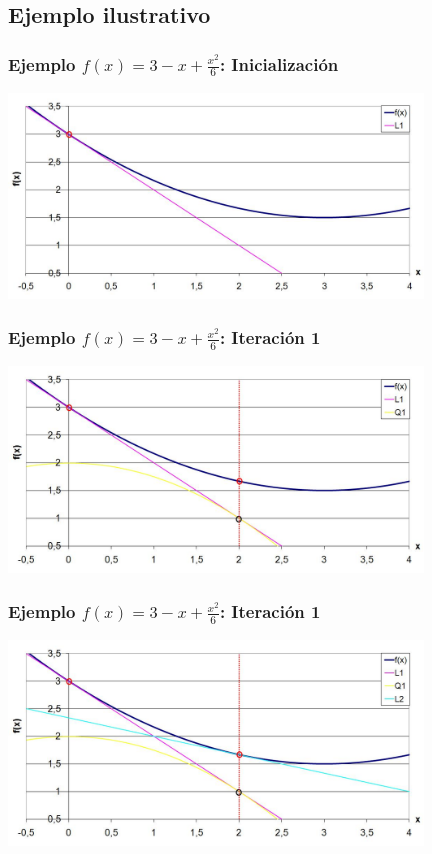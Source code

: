 \documentclass[xcolor=dvipsnames, utf8, spanish]{beamer} %
\begin{document}
\subsection{Ejemplo ilustrativo}

\begin{frame}
	\frametitle{Ejemplo $f(x)=3-x+\frac{x^2}{6}$: Inicialización}
	\begin{center}
		\includegraphics[width=11cm]{figuras/ejemplo01.JPG}
	\end{center}
\end{frame}

\begin{frame}
	\frametitle{Ejemplo $f(x)=3-x+\frac{x^2}{6}$: Iteración 1}
	\begin{center}
		\includegraphics[width=11cm]{figuras/ejemplo02.JPG}
	\end{center}
\end{frame}

\begin{frame}
	\frametitle{Ejemplo $f(x)=3-x+\frac{x^2}{6}$: Iteración 1}
	\begin{center}
		\includegraphics[width=11cm]{figuras/ejemplo03.JPG}
	\end{center}
\end{frame}
\end{document}
